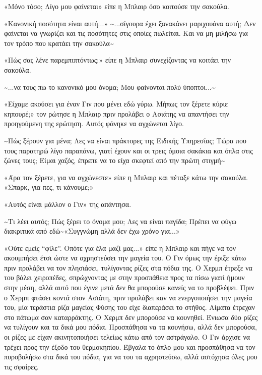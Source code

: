 \documentclass[12pt,twoside, openany]{book}
\begin{document}
«Μόνο τόσο; Λίγο μου φαίνεται» είπε η Μπλαιρ όσο κοιτούσε την σακούλα.

«Κανονική ποσότητα είναι αυτή...» \textasciitilde ...σίγουρα έχει ξανακάνει μαριχουάνα αυτή; Δεν φαίνεται να γνωρίζει και τις ποσότητες στις οποίες πωλείται. Και να μη μιλήσω για τον τρόπο που κρατάει την σακούλα\textasciitilde 

«Πώς σας λένε παρεμπιπτόντως;» είπε η Μπλαιρ συνεχίζοντας να κοιτάει την σακούλα.

\textasciitilde ...να τους πω το κανονικό μου όνομα; Μου φαίνονται πολύ ύποπτοι...\textasciitilde 

«Είχαμε ακούσει για έναν Γιν που μένει εδώ γύρω. Μήπως τον ξέρετε κύριε κηπουρέ;» τον ρώτησε η Μπλαιρ πριν προλάβει ο Ασιάτης να απαντήσει την προηγούμενη της ερώτηση. Αυτός φάνηκε να αγχώνεται λίγο.

\textasciitilde Πώς ξέρουν για μένα; Λες να είναι πράκτορες της Ειδικής Υπηρεσίας; Τώρα που τους παρατηρώ λίγο παραπάνω, γιατί έχουν και οι τρεις όμοια σακάκια και όπλα στις ζώνες τους; Είμαι χαζός, έπρεπε να το είχα σκεφτεί από την πρώτη στιγμή\textasciitilde 

«Άρα τον ξέρετε, για να αγχώνεστε» είπε η Μπλαιρ και πέταξε κάτω την σακούλα. «Σπαρκ, για πες, τι κάνουμε;»

«Αυτός είναι μάλλον ο Γιν» της απάντησα.

\textasciitilde Τι λέει αυτός; Πώς ξέρει το όνομα μου; Λες να είναι παγίδα; Πρέπει να φύγω διακριτικά από εδώ\textasciitilde  «Συγγνώμη αλλά δεν έχω χρόνο για...»

«Ούτε εμείς “φίλε”. Οπότε για έλα μαζί μας...» είπε η Μπλαιρ και πήγε να τον ακουμπήσει έτσι ώστε να αχρηστεύσει την μαγεία του. Ο Γιν όμως την έριξε κάτω πριν προλάβει να τον πλησιάσει, τυλίγοντας ρίζες στα πόδια της. Ο Χερμπ έτρεξε να του βάλει χειροπέδες, σπρώχνοντας με στην προσπάθεια προς τα πίσω γιατί ήμουν στην μέση, αλλά αυτό που έγινε μετά δεν θα μπορούσε κανείς να το προβλέψει. Πριν ο Χερμπ φτάσει κοντά στον Ασιάτη, πριν προλάβει καν να ενεργοποιήσει την μαγεία του, μία τεράστια ρίζα μαγείας Φύσης του είχε διαπεράσει το στήθος. Αίματα έτρεχαν στο πάτωμα σαν καταρράκτης. Ο Χερμπ δεν μπορούσε να κουνηθεί. Ένιωσα δύο ρίζες να τυλίγουν και τα δικά μου πόδια. Προσπάθησα να τα κουνήσω, αλλά δεν μπορούσα, οι ρίζες με είχαν ακινητοποιήσει τελείως κάτω από τον αστράγαλο. Ο Γιν άρχισε να τρέχει προς την έξοδο του θερμοκηπίου.  Έβγαλα το όπλο μου και προσπάθησα να τον πυροβολήσω στα δικά του πόδια, για να του τα αχρηστεύσω, αλλά αστόχησα όλες μου τις σφαίρες.
\end{document}
